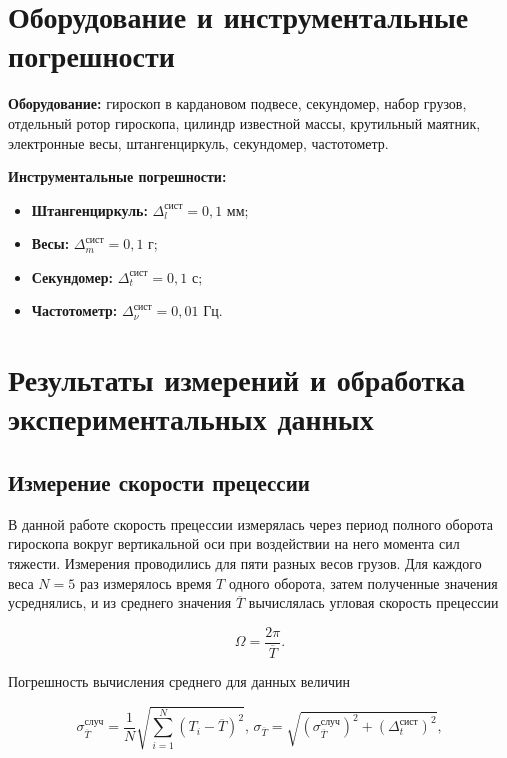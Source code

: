 \documentclass[a4paper,12pt]{article} %
\begin{document}
\section{Оборудование и инструментальные погрешности}

\textbf{Оборудование:} гироскоп в кардановом подвесе, секундомер, набор грузов, отдельный ротор гироскопа, цилиндр известной массы, крутильный маятник, электронные весы, штангенциркуль, секундомер, частотометр.

\textbf{Инструментальные погрешности:}

\begin{itemize}
    \item \textbf{Штангенциркуль:} $ \Delta_l^\text{сист} = 0,1 $ мм;
    \item \textbf{Весы:} $ \Delta_m^\text{сист} = 0,1 $ г;
    \item \textbf{Секундомер:} $ \Delta_t^\text{сист} = 0,1 $ с;
    \item \textbf{Частотометр:} $ \Delta_\nu^\text{сист} = 0,01 $ Гц.
\end{itemize}

\section{Результаты измерений и обработка экспериментальных данных}

\subsection{Измерение скорости прецессии}

В данной работе скорость прецессии измерялась через период полного оборота гироскопа вокруг вертикальной оси при воздействии на него момента сил тяжести. Измерения проводились для пяти разных весов грузов. Для каждого веса $ N = 5 $ раз измерялось время $ T $ одного оборота, затем полученные значения усреднялись, и из среднего значения $ \overline{T} $ вычислялась угловая скорость прецессии

\begin{equation}
    \Omega = \frac{2\pi}{\overline{T}}.
\end{equation}

Погрешность вычисления среднего для данных величин

\begin{equation}
    \sigma_{\overline{T}}^\text{случ} = \frac{1}{N} \sqrt{\sum_{i = 1}^N (T_i - \overline{T})^2}\text{,      } \sigma_{\overline{T}} = \sqrt{(\sigma_{\overline{T}}^\text{случ})^2 + (\Delta_t^\text{сист})^2},  
\end{equation}
\end{document}
